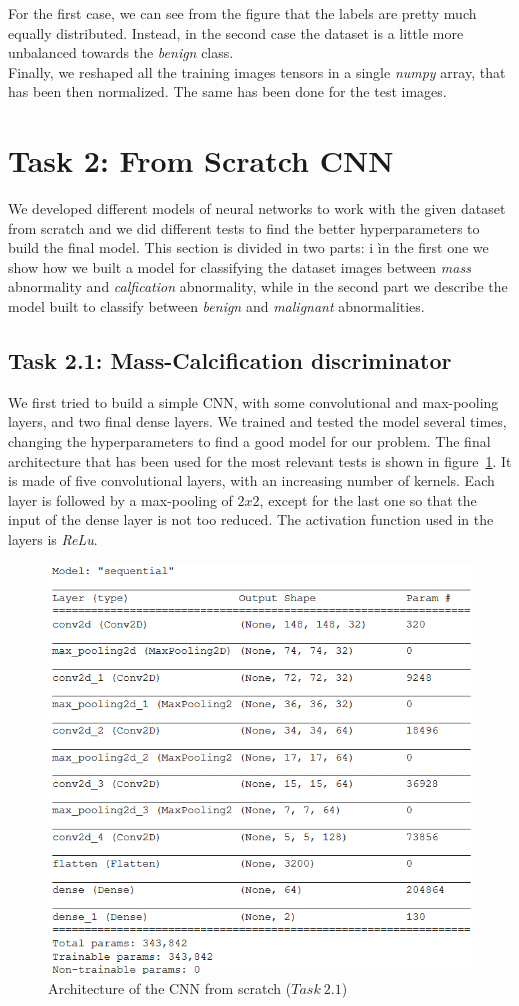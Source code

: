 \documentclass[11pt,a4paper,oneside]{article}
\begin{document}
For the first case, we can see from the figure that the labels are pretty much equally distributed. Instead, in the second case the dataset is a little more unbalanced towards the \textit{benign} class. \\
Finally, we reshaped all the training images tensors in a single \textit{numpy} array, that has been then normalized. The same has been done for the test images. 


\section{Task 2: From Scratch CNN}
We developed different models of neural networks to work with the given dataset from scratch and we did different tests to find the better hyperparameters to build the final model. This section is divided in two parts: i ìn the first one we show how we built a model for classifying the dataset images between \textit{mass} abnormality and \textit{calfication} abnormality, while in the second part we describe the model built to classify between \textit{benign} and \textit{malignant} abnormalities.

\subsection{Task 2.1: Mass-Calcification discriminator}
We first tried to build a simple CNN, with some convolutional and max-pooling layers, and two final dense layers. We trained and tested the model several times, changing the hyperparameters to find a good model for our problem. The final architecture that has been used for the most relevant tests is shown in figure~\ref{fig:scratch_model}. It is made of five convolutional layers, with an increasing number of kernels. Each layer is followed by a max-pooling of $2x2$, except for the last one so that the input of the dense layer is not too reduced. The activation function used in the layers is \textit{ReLu}.

\begin{figure}[h]
\centering
\includegraphics[width=.5\textwidth]{images/scratch_model}
\caption{Architecture of the CNN from scratch ($Task\ 2.1$)}
\label{fig:scratch_model}
\end{figure}
\end{document}
